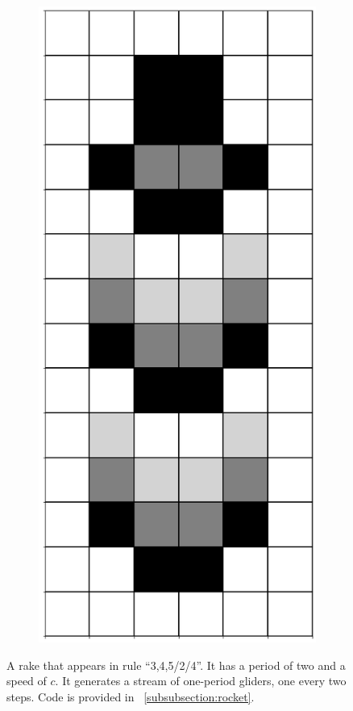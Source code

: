 \documentclass[12pt]{article}
\numberwithin{figure}{section} %
\begin{document}
\begin{figure}[H]
\begin{subfigure}{0.18\textwidth}
     	\subcaption{}
   	\end{subfigure}
	\begin{subfigure}{0.18\textwidth}
     	\centering
     	\includegraphics[width=\linewidth]{Section4/34.4}
     	\subcaption{}
   	\end{subfigure}
   \caption[A rocket glider]{A rake that appears in rule “3,4,5/2/4”. It has a period of two and a speed of $c$. It generates a stream of one-period gliders, one every two steps. Code is provided in ~\ref{subsubsection:rocket}.}
   \label{fig:rocket}
      \vspace{-1.5em}
\end{figure}
\end{document}
